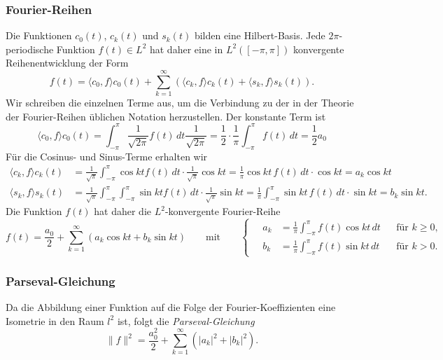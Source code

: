 %
%
\subsubsection{Fourier-Reihen}
Die Funktionen $c_0(t)$, $c_k(t)$ und $s_k(t)$ bilden eine Hilbert-Basis.
Jede $2\pi$-periodische Funktion $f(t)\in L^2$ hat daher eine in
$L^2([-\pi,\pi])$ konvergente Reihenentwicklung der Form
\[
f(t)
=
\langle c_0,f\rangle c_0(t)
+
\sum_{k=1}^\infty
(
\langle c_k,f\rangle c_k(t)
+
\langle s_k,f\rangle s_k(t)
).
\]
Wir schreiben die einzelnen Terme aus, um die Verbindung zu der in der
Theorie der Fourier-Reihen üblichen Notation herzustellen.
Der konstante Term ist
\[
\langle c_0,f\rangle c_0(t)
=
\int_{-\pi}^\pi \frac{1}{\!\sqrt{2\pi}} f(t)\,dt \frac{1}{\!\sqrt{2\pi}}
=
\frac12 \cdot \frac1{\pi} \int_{-\pi}^\pi f(t)\,dt
=
\frac12 a_0
\]
Für die Cosinus- und Sinus-Terme erhalten wir 
\begin{align*}
\langle c_k,f\rangle c_k(t)
&=
\frac{1}{\!\sqrt{\pi}}
\int_{-\pi}^\pi \cos kt f(t)\,dt \cdot \frac{1}{\!\sqrt{\pi}}\cos kt
=
\frac{1}{\pi} \cos kt\,f(t)\,dt\cdot \cos kt
=
a_k \cos kt
\\
\langle s_k,f\rangle s_k(t)
&=
\frac{1}{\!\sqrt{\pi}}
\int_{-\pi}^\pi \int_{-\pi}^\pi \sin kt f(t)\,dt \cdot \frac{1}{\!\sqrt{\pi}}\sin kt
=
\frac{1}{\pi} \int_{-\pi}^\pi \sin kt\,f(t)\,dt\cdot \sin kt
=
b_k \sin kt.
\end{align*}
Die Funktion $f(t)$ hat daher die $L^2$-konvergente Fourier-Reihe
\[
f(t) = \frac{a_0}{2} + \sum_{k=1}^\infty (a_k \cos kt + b_k \sin kt)
\qquad\text{mit}\qquad
\left\{
\quad
\begin{aligned}
a_k
&=
\frac{1}{\pi}
\int_{-\pi}^\pi f(t) \cos kt\,dt
&&\text{für $k\ge 0$,}
\\
b_k
&=
\frac{1}{\pi}
\int_{-\pi}^\pi f(t) \sin kt\,dt
&&\text{für $k> 0$.}
\end{aligned}
\right.
\]

%
%
\subsubsection{Parseval-Gleichung}
Da die Abbildung einer Funktion auf die Folge der Fourier-Koeffizienten
eine Isometrie in den Raum $l^2$ ist, folgt die {\em Parseval-Gleichung}
\begin{equation}
\| f\|^2
=
\frac{a_0^2}{2}
+
\sum_{k=1}^\infty(|a_k|^2 + |b_k|^2).
\label{buch:orthofkt:trigo:eqn:parseval}
\end{equation}

